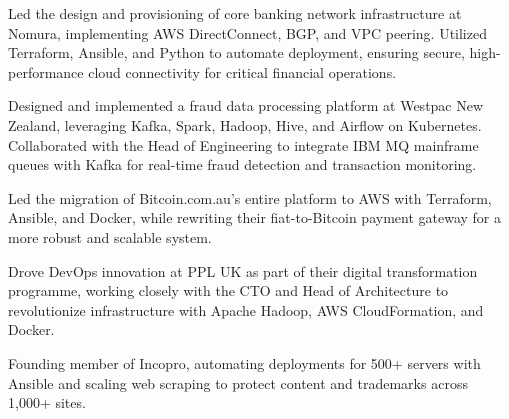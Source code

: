 \documentclass[]{resume}
\begin{document}
\begin{minipage}[t]{0.65\textwidth}
\begin{tightemize}
\item Led the design and provisioning of core banking network infrastructure at Nomura, implementing AWS DirectConnect, BGP, and VPC peering. Utilized Terraform, Ansible, and Python to automate deployment, ensuring secure, high-performance cloud connectivity for critical financial operations.
\end{tightemize}
\sectionsep

\begin{tightemize}
\item Designed and implemented a fraud data processing platform at Westpac New Zealand, leveraging Kafka, Spark, Hadoop, Hive, and Airflow on Kubernetes. Collaborated with the Head of Engineering to integrate IBM MQ mainframe queues with Kafka for real-time fraud detection and transaction monitoring.
\end{tightemize}
\sectionsep

\begin{tightemize}
\item Led the migration of Bitcoin.com.au’s entire platform to AWS with Terraform, Ansible, and Docker, while rewriting their fiat-to-Bitcoin payment gateway for a more robust and scalable system.
\end{tightemize}
\sectionsep

\begin{tightemize}
\item Drove DevOps innovation at PPL UK as part of their digital transformation programme, working closely with the CTO and Head of Architecture to revolutionize infrastructure with Apache Hadoop, AWS CloudFormation, and Docker.
\end{tightemize}
\sectionsep

\begin{tightemize}
\item Founding member of Incopro, automating deployments for 500+ servers with Ansible and scaling web scraping to protect content and trademarks across 1,000+ sites.
\end{tightemize}
\sectionsep

%
%

\end{minipage}
\end{document}
